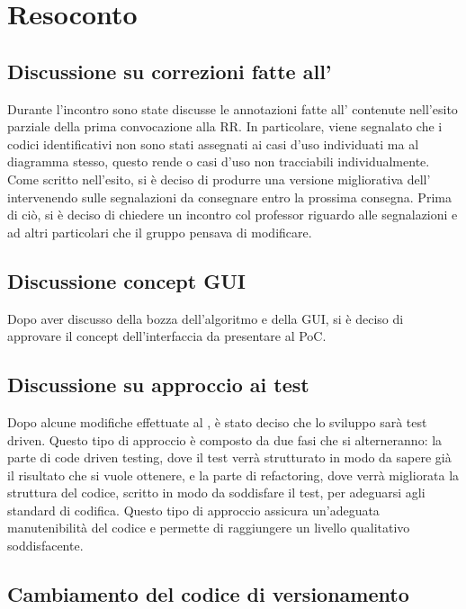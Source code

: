 \newpage


\section{Resoconto}

\subsection{Discussione su correzioni fatte all' \AdR{}}

	Durante l'incontro sono state discusse le annotazioni fatte all'\AdR{} 	contenute nell'esito parziale della prima convocazione alla RR. In particolare, viene segnalato che i codici identificativi non sono stati assegnati ai casi d'uso individuati ma al diagramma stesso, questo rende o casi d'uso non tracciabili individualmente. Come scritto nell'esito, si è deciso di produrre una versione migliorativa dell'\AdR{} intervenendo sulle segnalazioni da consegnare entro la prossima consegna. Prima di ciò, si è deciso di chiedere un incontro col professor \Riccardo{} riguardo alle segnalazioni e ad altri particolari che il gruppo pensava di modificare. 
	

\subsection{Discussione concept GUI}

	Dopo aver discusso della bozza dell'algoritmo e della GUI, si è deciso di approvare il concept dell'interfaccia da presentare al PoC. 

\subsection{Discussione su approccio ai test }

	Dopo alcune modifiche effettuate al \PdQ{}, è stato deciso che lo sviluppo sarà test driven. Questo tipo di approccio è composto da due fasi che si alterneranno: la parte di code driven testing, dove il test verrà strutturato in modo da sapere già il risultato che si vuole ottenere, e la parte di refactoring, dove verrà migliorata la struttura del codice, scritto in modo da soddisfare il test,  per adeguarsi agli standard di codifica. Questo tipo di approccio assicura un'adeguata manutenibilità del codice e permette di raggiungere un livello qualitativo soddisfacente.

\subsection{Cambiamento del codice di versionamento}

